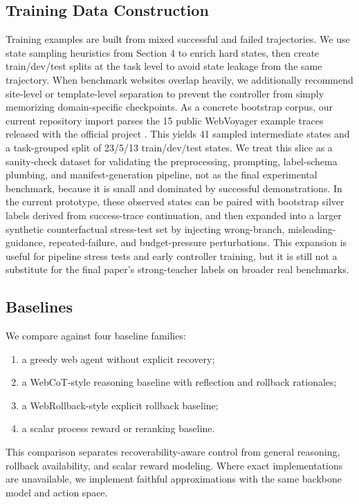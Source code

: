 \documentclass[11pt]{article}
\begin{document}
\subsection{Training Data Construction}
Training examples are built from mixed successful and failed trajectories. We use state sampling heuristics from Section 4 to enrich hard states, then create train/dev/test splits at the task level to avoid state leakage from the same trajectory. When benchmark websites overlap heavily, we additionally recommend site-level or template-level separation to prevent the controller from simply memorizing domain-specific checkpoints.
As a concrete bootstrap corpus, our current repository import parses the 15 public WebVoyager example traces released with the official project \citep{he-etal-2024-webvoyager}. This yields 41 sampled intermediate states and a task-grouped split of 23/5/13 train/dev/test states. We treat this slice as a sanity-check dataset for validating the preprocessing, prompting, label-schema plumbing, and manifest-generation pipeline, not as the final experimental benchmark, because it is small and dominated by successful demonstrations. In the current prototype, these observed states can be paired with bootstrap silver labels derived from success-trace continuation, and then expanded into a larger synthetic counterfactual stress-test set by injecting wrong-branch, misleading-guidance, repeated-failure, and budget-pressure perturbations. This expansion is useful for pipeline stress tests and early controller training, but it is still not a substitute for the final paper's strong-teacher labels on broader real benchmarks.

\subsection{Baselines}
We compare against four baseline families:
\begin{enumerate}[leftmargin=*]
    \item a greedy web agent without explicit recovery;
    \item a WebCoT-style reasoning baseline with reflection and rollback rationales;
    \item a WebRollback-style explicit rollback baseline;
    \item a scalar process reward or reranking baseline.
\end{enumerate}
This comparison separates recoverability-aware control from general reasoning, rollback availability, and scalar reward modeling. Where exact implementations are unavailable, we implement faithful approximations with the same backbone model and action space.
\end{document}
